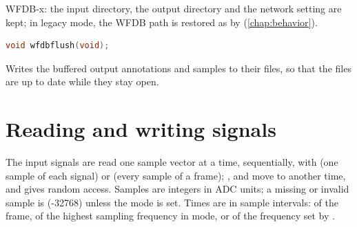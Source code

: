 WFDB-x: the input directory, the output directory and the network setting
are kept; in legacy mode, the WFDB path is restored as by 
(\cref{chap:behavior}).

\begin{lstlisting}[language=C,style=signature]
void wfdbflush(void);
\end{lstlisting}
Writes the buffered output annotations and samples to their files, so that
the files are up to date while they stay open.

\section{Reading and writing signals}
\label{sec:library-signals}

The input signals are read one sample vector at a time, sequentially, with
 (one sample of each signal) or  (every sample of
a frame); ,  and  move to
another time, and  gives random access. Samples are integers in
ADC units; a missing or invalid sample is 
(-32768) unless the  mode is set. Times are in sample
intervals: of the frame, of the highest sampling frequency in
 mode, or of the frequency set by .

